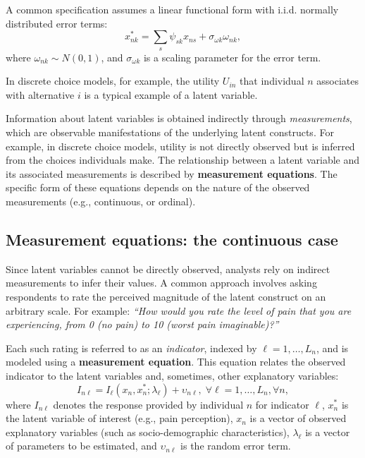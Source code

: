 \documentclass[12pt,a4paper]{article}
\begin{document}
A common specification assumes a linear functional form   with i.i.d. normally distributed  error terms:
\begin{equation}
\label{eq:linearStructural}
 x_{nk}^* = \sum_s \psi_{sk} x_{ns} + \sigma_{\omega k} \omega_{nk},
\end{equation}
where $\omega_{nk} \sim N(0, 1)$, and $\sigma_{\omega k}$ is a scaling parameter for the error term. 

In discrete choice models, for example, the utility $U_{in}$ that
individual $n$ associates with alternative $i$ is a typical example of
a latent variable.

Information about latent variables is obtained indirectly through
\emph{measurements}, which are observable manifestations of the
underlying latent constructs. For example, in discrete choice models,
utility is not directly observed but is inferred from the choices
individuals make. The relationship between a latent variable and its
associated measurements is described by \textbf{measurement
  equations}. The specific form of these equations depends on the
nature of the observed measurements (e.g., continuous, or ordinal).


\subsection{Measurement equations: the continuous case}
\label{sec:continuous}

Since latent variables cannot be directly observed, analysts rely on
indirect measurements to infer their values. A common approach
involves asking respondents to rate the perceived magnitude of the
latent construct on an arbitrary scale. For example: \emph{``How would
you rate the level of pain that you are experiencing, from 0 (no pain)
to 10 (worst pain imaginable)?''}

Each such rating is referred to as an \emph{indicator}, indexed by
$\ell=1, \ldots, L_n$, and is modeled using a \textbf{measurement equation}. This
equation relates the observed indicator to the latent variables and, sometimes,
other explanatory variables:
\begin{equation}
\label{eq:continuousMeasurement}
I_{n\ell} = I_\ell(x_n, x_n^*;\lambda_\ell) + \upsilon_{n\ell}, \; \forall \ell=1, \ldots, L_n, \forall n,
\end{equation}
where $I_{n\ell}$ denotes the response provided by individual $n$ for
indicator $\ell$, $x_n^*$ is the latent variable of interest (e.g., pain
perception), $x_n$ is a vector of observed explanatory variables (such as
socio-demographic characteristics), $\lambda_\ell$ is a vector of
parameters to be estimated, and $\upsilon_{n\ell}$ is the random error term.
\end{document}
